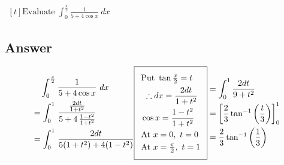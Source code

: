 \documentclass[17pt]{extarticle}
\begin{document}
\begin{fleqn}
$\begin{aligned}[t] 
\text{Evaluate \ } \int_{0}^{\frac{\pi}{2}} \frac{1}{5 + 4\cos x}\ dx
\end{aligned}$

\subsection*{Answer}
\begin{equation} \nonumber
\begin{alignedat}{4}
& \quad  \int_{0}^{\frac{\pi}{2}} \frac{1}{5 + 4\cos x}\ dx \\
&= \int_{0}^{1}\,\frac{\frac{2dt}{1+ t^2}}{5 + 4\, \frac{1 - t^2}{1 + t^2}}\\
&= \int_{0}^{1}\,\frac{2dt}{5(1+t^2) + 4(1-t^2)}\\
\end{alignedat}
\begin{alignedat}{4}
    \addtolength{\fboxsep}{5pt}
    \boxed{
     \begin{split}
       & \text{Put } \tan \tfrac{x}{2}=t\\
       & \ \therefore dx =\frac{2dt}{1 + t^2}\\
        & \cos x =  \frac{1 - t^2}{1 + t^2}\\
         & \text{At } x=0,\  t=0\\
         & \text{At } x=\tfrac{\pi}{2},\  t=1\\
        \end{split}
     }\end{alignedat}
\begin{alignedat}{4}
&= \int_{0}^{1}\frac{2dt}{9+t^2}\\
&= \left[\frac{2}{3}\tan^{-1}\left(\frac{t}{3}\right)\right]_{0}^{1}\\
&= \frac{2}{3}\tan^{-1}\left(\frac{1}{3}\right)\\
\end{alignedat}
\end{equation}

\end{fleqn}
\end{document}
